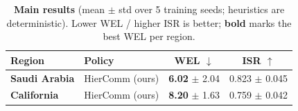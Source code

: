 \begin{table}[t]
\centering
\caption{\textbf{Main results} (mean $\pm$ std over 5 training seeds; heuristics are deterministic). Lower WEL / higher ISR is better; \textbf{bold} marks the best WEL per region.}
\label{tab:main_results}
\begin{tabular}{llcc}
\toprule
Region & Policy & WEL $\downarrow$ & ISR $\uparrow$ \\
\midrule
\multirow{1}{*}{\textbf{Saudi Arabia}}
& HierComm (ours) & \textbf{6.02} $\pm$ 2.04 & 0.823 $\pm$ 0.045 \\
\midrule
\multirow{1}{*}{\textbf{California}}
& HierComm (ours) & \textbf{8.20} $\pm$ 1.63 & 0.759 $\pm$ 0.042 \\
\bottomrule
\end{tabular}
\end{table}
